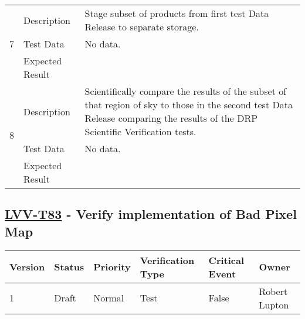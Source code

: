 \begin{longtable}[]{p{1.3cm}p{2cm}p{13cm}}
            \multirow{3}{*}{ 7 } & Description &
            \begin{minipage}[t]{13cm}{\footnotesize
            Stage subset of products from first test Data Release to separate
storage.

            \vspace{\dp0}
            } \end{minipage} \\ \cline{2-3}
            & Test Data &
            \begin{minipage}[t]{13cm}{\footnotesize
                No data.
                \vspace{\dp0}
            } \end{minipage} \\ \cline{2-3}
            & Expected Result &
        \\ \midrule

            \multirow{3}{*}{ 8 } & Description &
            \begin{minipage}[t]{13cm}{\footnotesize
            Scientifically compare the results of the subset of that region of sky
to those in the second test Data Release comparing the results of the
DRP Scientific Verification tests.

            \vspace{\dp0}
            } \end{minipage} \\ \cline{2-3}
            & Test Data &
            \begin{minipage}[t]{13cm}{\footnotesize
                No data.
                \vspace{\dp0}
            } \end{minipage} \\ \cline{2-3}
            & Expected Result &
        \\ \midrule
    \end{longtable}

\subsection{\href{https://jira.lsstcorp.org/secure/Tests.jspa\#/testCase/LVV-T83}{LVV-T83}
    - Verify implementation of Bad Pixel Map}\label{lvv-t83}

\begin{longtable}[]{llllll}
\toprule
Version & Status & Priority & Verification Type & Critical Event & Owner
\\\midrule
1 & Draft & Normal &
Test & False & Robert Lupton
\\\bottomrule
\end{longtable}

